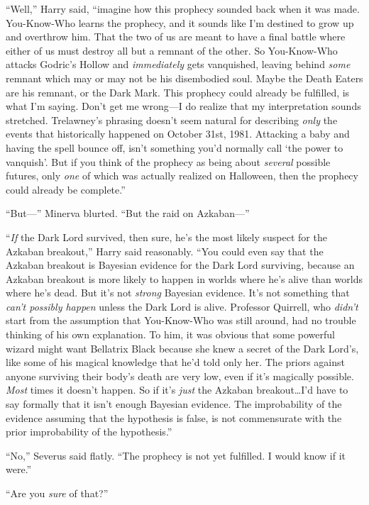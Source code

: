 “Well,” Harry said, “imagine how this prophecy sounded back when it was made. You-Know-Who learns the prophecy, and it sounds like I’m destined to grow up and overthrow him. That the two of us are meant to have a final battle where either of us must destroy all but a remnant of the other. So You-Know-Who attacks Godric’s Hollow and \emph{immediately} gets vanquished, leaving behind \emph{some} remnant which may or may not be his disembodied soul. Maybe the Death Eaters are his remnant, or the Dark Mark. This prophecy could already be fulfilled, is what I’m saying. Don’t get me wrong—I do realize that my interpretation sounds stretched. Trelawney’s phrasing doesn’t seem natural for describing \emph{only} the events that historically happened on October 31st, 1981. Attacking a baby and having the spell bounce off, isn’t something you’d normally call ‘the power to vanquish’. But if you think of the prophecy as being about \emph{several} possible futures, only \emph{one} of which was actually realized on Halloween, then the prophecy could already be complete.”

“But—” Minerva blurted. “But the raid on Azkaban—”

“\emph{If} the Dark Lord survived, then sure, he’s the most likely suspect for the Azkaban breakout,” Harry said reasonably. “You could even say that the Azkaban breakout is Bayesian evidence for the Dark Lord surviving, because an Azkaban breakout is more likely to happen in worlds where he’s alive than worlds where he’s dead. But it’s not \emph{strong} Bayesian evidence. It’s not something that \emph{can’t possibly happen} unless the Dark Lord is alive. Professor Quirrell, who \emph{didn’t} start from the assumption that You-Know-Who was still around, had no trouble thinking of his own explanation. To him, it was obvious that some powerful wizard might want Bellatrix Black because she knew a secret of the Dark Lord’s, like some of his magical knowledge that he’d told only her. The priors against anyone surviving their body’s death are very low, even if it’s magically possible. \emph{Most} times it doesn’t happen. So if it’s \emph{just} the Azkaban breakout…I’d have to say formally that it isn’t enough Bayesian evidence. The improbability of the evidence assuming that the hypothesis is false, is not commensurate with the prior improbability of the hypothesis.”

“No,” Severus said flatly. “The prophecy is not yet fulfilled. I would know if it were.”

“Are you \emph{sure} of that?”

